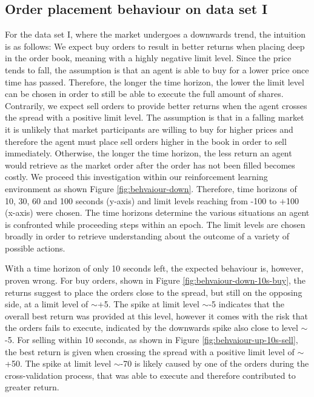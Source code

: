 \subsection{Order placement behaviour on data set I}
For the data set I, where the market undergoes a downwards trend, the intuition is as follows:
We expect buy orders to result in better returns when placing deep in the order book, meaning with a highly negative limit level.
Since the price tends to fall, the assumption is that an agent is able to buy for a lower price once time has passed.
Therefore, the longer the time horizon, the lower the limit level can be chosen in order to still be able to execute the full amount of shares.
Contrarily, we expect sell orders to provide better returns when the agent crosses the spread with a positive limit level.
The assumption is that in a falling market it is unlikely that market participants are willing to buy for higher prices and therefore the agent must place sell orders higher in the book in order to sell immediately.
Otherwise, the longer the time horizon, the less return an agent would retrieve as the market order after the order has not been filled becomes costly.
We proceed this investigation within our reinforcement learning environment as shown Figure \ref{fig:behvaiour-down}.
Therefore, time horizons of 10, 30, 60 and 100 seconds (y-axis) and limit levels reaching from -100 to +100 (x-axis) were chosen.
The time horizons determine the various situations an agent is confronted while proceeding steps within an epoch.
The limit levels are chosen broadly in order to retrieve understanding about the outcome of a variety of possible actions.

With a time horizon of only 10 seconds left, the expected behaviour is, however, proven wrong.
For buy orders, shown in Figure \ref{fig:behvaiour-down-10s-buy}, the returns suggest to place the orders close to the spread, but still on the opposing side, at a limit level of $\sim$+5.
The spike at limit level $\sim$-5 indicates that the overall best return was provided at this level, however it comes with the risk that the orders fails to execute, indicated by the downwards spike also close to level $\sim$-5.
For selling within 10 seconds, as shown in Figure \ref{fig:behvaiour-up-10s-sell}, the best return is given when crossing the spread with a positive limit level of $\sim$+50.
The spike at limit level $\sim$-70 is likely caused by one of the orders during the cross-validation process, that was able to execute and therefore contributed to greater return.

